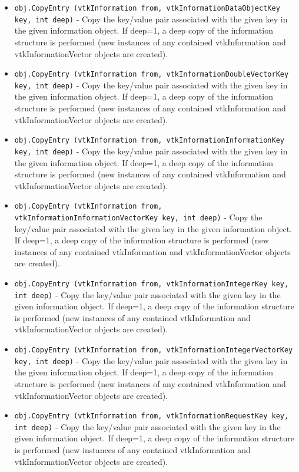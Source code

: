 \begin{itemize}
\item  \verb|obj.CopyEntry (vtkInformation from, vtkInformationDataObjectKey key, int deep)| -  Copy the key/value pair associated with the given key in the
 given information object.  If deep=1, a deep copy of the information
 structure is performed (new instances of any contained vtkInformation and
 vtkInformationVector objects are created).

\item  \verb|obj.CopyEntry (vtkInformation from, vtkInformationDoubleVectorKey key, int deep)| -  Copy the key/value pair associated with the given key in the
 given information object.  If deep=1, a deep copy of the information
 structure is performed (new instances of any contained vtkInformation and
 vtkInformationVector objects are created).

\item  \verb|obj.CopyEntry (vtkInformation from, vtkInformationInformationKey key, int deep)| -  Copy the key/value pair associated with the given key in the
 given information object.  If deep=1, a deep copy of the information
 structure is performed (new instances of any contained vtkInformation and
 vtkInformationVector objects are created).

\item  \verb|obj.CopyEntry (vtkInformation from, vtkInformationInformationVectorKey key, int deep)| -  Copy the key/value pair associated with the given key in the
 given information object.  If deep=1, a deep copy of the information
 structure is performed (new instances of any contained vtkInformation and
 vtkInformationVector objects are created).

\item  \verb|obj.CopyEntry (vtkInformation from, vtkInformationIntegerKey key, int deep)| -  Copy the key/value pair associated with the given key in the
 given information object.  If deep=1, a deep copy of the information
 structure is performed (new instances of any contained vtkInformation and
 vtkInformationVector objects are created).

\item  \verb|obj.CopyEntry (vtkInformation from, vtkInformationIntegerVectorKey key, int deep)| -  Copy the key/value pair associated with the given key in the
 given information object.  If deep=1, a deep copy of the information
 structure is performed (new instances of any contained vtkInformation and
 vtkInformationVector objects are created).

\item  \verb|obj.CopyEntry (vtkInformation from, vtkInformationRequestKey key, int deep)| -  Copy the key/value pair associated with the given key in the
 given information object.  If deep=1, a deep copy of the information
 structure is performed (new instances of any contained vtkInformation and
 vtkInformationVector objects are created).


\end{itemize}
